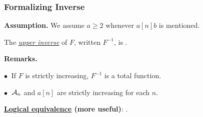 %
%
%
%
%
%
%
%
%
%


\begin{frame}
\frametitle{Formalizing Inverse}

\textbf{Assumption.} We assume $a\ge 2$ whenever $a[n]b$ is mentioned.

\bigskip

\pause

The \href{https://github.com/inv-ack/inv-ack/blob/7270e64a2600b771f2b1b1b151f7d13fb2ae6c97/inverse.v\#L28-L45}{
	\emph{upper inverse}} of $F$, written $F^{-1}$,
is .

\smallskip

\textbf{Remarks.}

$\bullet~$ If $F$ is strictly increasing, $F^{-1}$ is a total function.

$\bullet~$ $\mathcal{A}_n$ and $a[n]$ are strictly increasing for each $n$.




\bigskip

\pause 
\textbf{\href{https://github.com/inv-ack/inv-ack/blob/7270e64a2600b771f2b1b1b151f7d13fb2ae6c97/inverse.v\#L65-L77}{Logical equivalence} (more useful)}:
.

\end{frame}



